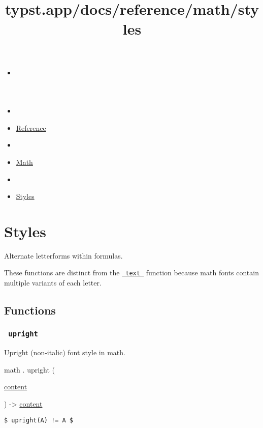 \title{typst.app/docs/reference/math/styles}

\begin{itemize}
\tightlist
\item
  \href{/docs}{}
\item
  
\item
  \href{/docs/reference/}{Reference}
\item
  
\item
  \href{/docs/reference/math/}{Math}
\item
  
\item
  \href{/docs/reference/math/styles}{Styles}
\end{itemize}

\section{Styles}\label{summary}

Alternate letterforms within formulas.

These functions are distinct from the
\href{/docs/reference/text/text/}{\texttt{\ text\ }} function because
math fonts contain multiple variants of each letter.

\subsection{Functions}\label{functions}

\subsubsection{\texorpdfstring{\texttt{\ upright\ }}{ upright }}\label{functions-upright}

Upright (non-italic) font style in math.

math { . } { upright } (

{ \href{/docs/reference/foundations/content/}{content} }

) -\textgreater{} \href{/docs/reference/foundations/content/}{content}

\begin{verbatim}
$ upright(A) != A $
\end{verbatim}

